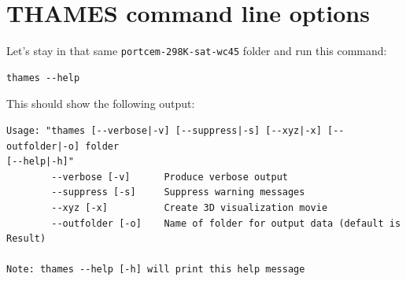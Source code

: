 \documentclass{article}
\begin{document}
\section{\label{sec:cmdline} THAMES command line options}
Let's stay in that same \verb|portcem-298K-sat-wc45| folder and run this command:
\small{
	\begin{verbatim}
thames --help 
\end{verbatim}
} \normalsize
This should show the following output:
\small{
	\begin{verbatim}
Usage: "thames [--verbose|-v] [--suppress|-s] [--xyz|-x] [--outfolder|-o] folder
[--help|-h]"
        --verbose [-v]      Produce verbose output
        --suppress [-s]     Suppress warning messages
        --xyz [-x]          Create 3D visualization movie
        --outfolder [-o]    Name of folder for output data (default is Result)

Note: thames --help [-h] will print this help message
\end{verbatim}
} \normalsize
\end{document}
